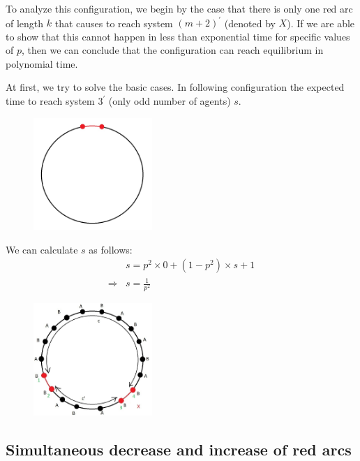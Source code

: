 \documentclass[]{book}
\theoremstyle{definition}
\begin{document}
To analyze this configuration, we begin by the case that there is only one red arc of length $k$ that causes to reach system $(m+2)^\prime$ (denoted by $X$). If we are able to show that this cannot happen in less than exponential time for specific values of $p$, then we can conclude that the configuration can reach equilibrium in polynomial time.

At first, we try to solve the basic cases. In following configuration the expected time to reach system $3^\prime$ (only odd number of agents) $s$. 
\begin{figure}[H]
    \centering
    \includegraphics[width=0.4\textwidth]{figures/sync_pure_increase_1.jpg}
    \caption{}
\end{figure}
We can calculate $s$ as follows:
\begin{equation}
\begin{split}
    &s = p^2 \times 0 + \left( 1 - p^2 \right)\times s + 1 \\
    \Rightarrow &s = \frac{1}{p^2}
\end{split}
\end{equation}

\begin{figure}[H]
    \centering
    \includegraphics[width=0.4\textwidth]{figures/sync_pure_increase_2.jpg}
    \caption{}
\end{figure}

\subsection{Simultaneous decrease and increase of red arcs}
\newpage
\end{document}
